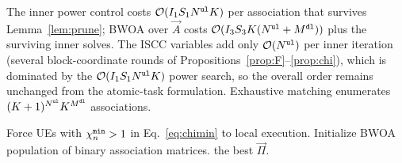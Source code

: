 \documentclass[journal]{IEEEtran}
\begin{document}
The {inner power control} costs $\mathcal{O}(I_1 S_1 N^{\tt ul}K)$ per association that survives Lemma~\ref{lem:prune}; 
BWOA over $\vec{A}$ costs $\mathcal{O}(I_3 S_3 K(N^{\tt ul}+M^{\tt dl}))$ plus the surviving inner solves. The ISCC variables add only $\mathcal{O}(N^{\tt ul})$ per inner iteration (several block-coordinate rounds of Propositions~\ref{prop:F}--\ref{prop:chi}), which is dominated by the $\mathcal{O}(I_1 S_1 N^{\tt ul}K)$ power search, so the overall order remains unchanged from the atomic-task formulation. Exhaustive matching enumerates $(K+1)^{N^{\tt ul}}K^{M^{\tt dl}}$ associations.

{\begin{algorithm}[!t]
\footnotesize
\DontPrintSemicolon
{}
Force UEs with $\chi_n^{\tt min}>1$ in Eq.~\eqref{eq:chimin} to local execution.\;
Initialize BWOA population of binary association matrices.\;
\Return the best $\vec{\Pi}$.\;
\caption{Hybrid {WOA/PSO/PGD}--BWOA for SI-TNTN UAV edge-inference ISCC.}
\label{alg:hyb}
\end{algorithm}
}
\end{document}
